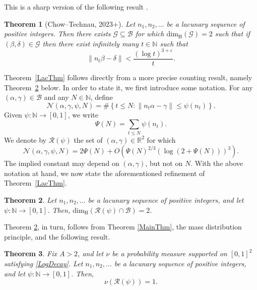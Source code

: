 \documentclass[12pt, reqno]{amsart}
\newtheorem{thm}{Theorem}[section]
\theoremstyle{definition}
\theoremstyle{remark}
\numberwithin{equation}{section}
\def\alp{{\alpha}} \def\bfalp{{\boldsymbol \alpha}}
\def\bet{{\beta}}  \def\bfbet{{\boldsymbol \beta}}
\def\gam{{\gamma}} \def\Gam{{\Gamma}}
\def\del{{\delta}} \def\Del{{\Delta}}
\def\eps{\varepsilon}
\def\le{\leqslant} \def\ge{\geqslant}
\def\ls{\leqslant} \def\gs{\geqslant}
\def \bN {\mathbb N}
\def \bR {\mathbb R}
\def \cB {\mathcal B}
\def \cG {\mathcal G}
\def \cN {\mathcal N}
\def \cR {\mathcal R}
\def \dim {\mathrm{dim}}
\def \dimH {\dim_{\mathrm{H}}}
\begin{document}
	\noindent
	This is a sharp version of the following result \cite[Theorem 1.11]{CT}.
	
	\begin{thm} [Chow--Technau, 2023+]
		Let $n_1, n_2, \ldots$ be a lacunary sequence of positive integers. Then there exists $\cG \subseteq \cB$ for which $\dimH(\cG) = 2$ such that if $(\bet, \del) \in \cG$ then there exist infinitely many $t \in \bN$ such that
		\[
		\| n_t \bet - \del \| <
		\frac{(\log t)^{3 + \eps}}{t}.
		\]
	\end{thm}
	
	Theorem~\ref{LacThm} follows directly from a more precise counting result, namely Theorem~\ref{CountingThm} below. In order to state it, we first introduce some notation. For any $(\alp,\gam) \in \cB$ and any $N\in\bN$, define
	\begin{equation} \label{def_cN}
		\cN(\alp,\gam,\psi,N)
		= \# \left\{
		t \ls N :  \| n_t \alp - \gam \| 
		\le \psi(n_t)
		\right\}.
	\end{equation}
	Given $\psi: \bN \to [0,1]$, we write
	\begin{equation} \label{PsiDef}
		\Psi(N) = \sum_{t \le N} \psi(n_t).
	\end{equation}
	We denote by $\cR(\psi)$ the set of $(\alp,\gam) \in \bR^2$ for which
	\begin{equation} \label{countlacresult}
		\cN(\alp,\gam,\psi,N) = 2\Psi(N) + O(\Psi(N)^{2/3}
		\left(\log (2+\Psi(N))\right)^3).
	\end{equation}
	The implied constant may depend on $(\alp,\gam)$, but not on $N$. With the above notation at hand, we now state the aforementioned refinement of Theorem~\ref{LacThm}.
	\begin{thm} \label{CountingThm}
		Let $n_1, n_2, \ldots$ be a lacunary sequence of positive integers, and let $\psi: \bN \to [0,1]$. %
		Then, $\dim_{\mathrm{H}}
		(\cR(\psi) \cap \cB)
		= 2$.
	\end{thm}
	
	Theorem \ref{CountingThm}, in turn, follows from Theorem \ref{MainThm}, the mass distribution principle, and the following result.
	
	\begin{thm}
		\label{GeneralCountingThm} \label{thm_lacunary}
		Fix $A > 2$, and let $\nu$ be a probability measure supported on $[0,1]^2$ satisfying \eqref{LogDecay}. Let $n_1, n_2, \ldots$ be a lacunary sequence of positive integers, and let $\psi: \bN \to [0,1]$.
		Then,
		\[
		\nu(\cR(\psi)) = 1.
		\]
	\end{thm}
	
\end{document}
